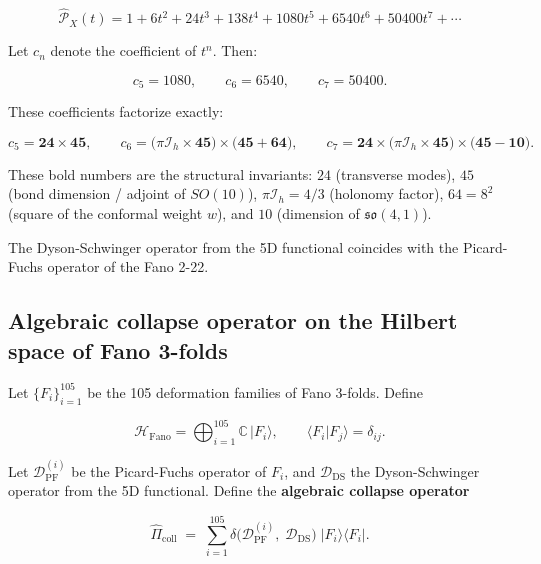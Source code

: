 \documentclass[12pt]{article}
\numberwithin{equation}{section}
\begin{document}
\begin{equation}\label{eq:minkowski}
\widehat{\mathcal{P}}_X(t) = 1 + 6t^2 + 24t^3 + 138t^4 + 1080t^5 + 6540t^6 + 50400t^7 + \cdots
\end{equation}

Let \(c_n\) denote the coefficient of \(t^n\). Then:

\begin{equation}\label{eq:coeffs}
c_5 = 1080,\qquad c_6 = 6540,\qquad c_7 = 50400.
\end{equation}

These coefficients factorize exactly:

\begin{equation}\label{eq:fano_factorization}
\boxed{c_5 = \mathbf{24} \times \mathbf{45},\qquad
c_6 = \bigl(\pi \mathcal{I}_h \times \mathbf{45}\bigr) \times \bigl(\mathbf{45} + \mathbf{64}\bigr),\qquad
c_7 = \mathbf{24} \times \bigl(\pi \mathcal{I}_h \times \mathbf{45}\bigr) \times \bigl(\mathbf{45} - \mathbf{10}\bigr).}
\end{equation}

These bold numbers are the structural invariants: \(24\) (transverse modes), \(45\) (bond dimension / adjoint of \(SO(10)\)), \(\pi \mathcal{I}_h = 4/3\) (holonomy factor), \(64 = 8^2\) (square of the conformal weight \(w\)), and \(10\) (dimension of \(\mathfrak{so}(4,1)\)).

The Dyson-Schwinger operator from the 5D functional coincides with the Picard-Fuchs operator of the Fano 2-22.

\subsection{Algebraic collapse operator on the Hilbert space of Fano 3-folds}

Let \(\{F_i\}_{i=1}^{105}\) be the 105 deformation families of Fano 3-folds. Define

\begin{equation}\label{eq:hilbert_fano}
\mathcal{H}_{\text{Fano}} = \bigoplus_{i=1}^{105} \mathbb{C} \, |F_i\rangle,\qquad \langle F_i | F_j \rangle = \delta_{ij}.
\end{equation}

Let \(\mathcal{D}_{\text{PF}}^{(i)}\) be the Picard-Fuchs operator of \(F_i\), and \(\mathcal{D}_{\text{DS}}\) the Dyson-Schwinger operator from the 5D functional. Define the \textbf{algebraic collapse operator}

\begin{equation}\label{eq:collapse}
\hat{\Pi}_{\text{coll}} \;=\; \sum_{i=1}^{105} \delta\bigl(\mathcal{D}_{\text{PF}}^{(i)},\; \mathcal{D}_{\text{DS}}\bigr) \; |F_i\rangle\langle F_i|.
\end{equation}
\end{document}
